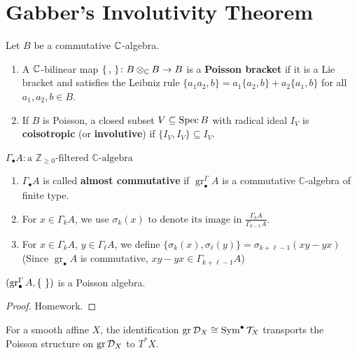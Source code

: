 \section{Gabber's Involutivity Theorem}
Let $B$ be a commutative $\mathbb{C}$-algebra.

\begin{definition}
	\leavevmode
	\begin{enumerate}
		\item A $\mathbb{C}$-bilinear map $\{\,,\,\}\colon B\otimes_{\mathbb{C}}B\to B$ is a \textbf{Poisson bracket}
		      if it is a Lie bracket and satisfies the Leibniz rule $\{a_1a_2,b\}=a_1\{a_2,b\}+a_2\{a_1,b\}$ for all $a_1,a_2,b\in B$.
		\item If $B$ is Poisson, a closed subset $V\subseteq\operatorname{Spec} B$ with radical ideal $I_V$ is
		      \textbf{coisotropic} (or \textbf{involutive}) if $\{I_V,I_V\}\subseteq I_V$.
	\end{enumerate}
\end{definition}

\noindent $\Gamma_\bullet A : \text{a } \mathbb{Z}_{\ge 0}\text{-filtered } \mathbb{C}\text{-algebra}$
\begin{definition}
	\leavevmode
	\begin{enumerate}
		\item $\Gamma_\bullet A$ is called \textbf{almost commutative} if $\operatorname{gr}^\Gamma_\bullet A$ is a commutative $\mathbb{C}$-algebra of finite type.
		\item For $x \in \Gamma_k A$, we use $\sigma_k(x) \text{ to denote its image in } \frac{\Gamma_k A}{\Gamma_{k-1} A}$.
		\item For $x \in \Gamma_k A$, $y \in \Gamma_{\ell} A$, we define $\{ \sigma_k(x), \sigma_{\ell}(y) \} = \sigma_{k+\ell-1}(xy - yx)$
		      (Since $\operatorname{gr}_\bullet A$ is commutative, $xy - yx \in \Gamma_{k+\ell-1} A$)
	\end{enumerate}
\end{definition}

\begin{lemma}[Lemma~6.3]
	$(\operatorname{gr}^{\Gamma}_\bullet A,\{\,\,\})$ is a Poisson algebra.
\end{lemma}
\begin{proof}
	Homework.
\end{proof}

\begin{example}
	For a smooth affine $X$, the identification $\operatorname{gr} \mathcal{D}_X\cong \operatorname{Sym}^{\bullet}\mathcal{T}_X$ transports the
	Poisson structure on $\operatorname{gr} \mathcal{D}_X$ to $T^{\ast}X$.
\end{example}

